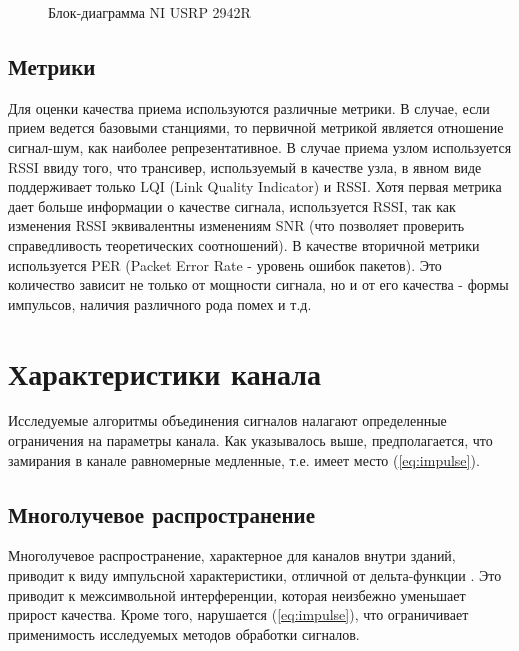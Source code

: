 \documentclass[a4paper,12pt,oneside, abstract=true]{scrartcl}
\begin{document}
\begin{figure}[h!]
\caption{Блок-диаграмма NI USRP 2942R}
\label{fig:USRPBD}
\end{figure}

\subsection{Метрики}
Для оценки качества приема используются различные метрики.
В случае, если прием ведется базовыми станциями, то первичной метрикой является отношение сигнал-шум, как наиболее репрезентативное.
В случае приема узлом используется RSSI ввиду того, что трансивер, используемый в качестве узла, в явном виде поддерживает только LQI (Link Quality Indicator) и RSSI. 
Хотя первая метрика дает больше информации о качестве сигнала, используется RSSI, так как изменения RSSI эквивалентны изменениям SNR (что позволяет проверить справедливость теоретических соотношений).
В качестве вторичной метрики используется PER (Packet Error Rate - уровень ошибок пакетов). Это количество зависит не только от мощности сигнала, но и от его качества - формы импульсов, наличия различного рода помех и т.д.
\clearpage

\section{Характеристики канала}
Исследуемые алгоритмы объединения сигналов налагают определенные ограничения на параметры канала. 
Как указывалось выше, предполагается, что замирания в канале равномерные медленные, т.е. имеет место (\ref{eq:impulse}). 
\subsection{Многолучевое распространение}
Многолучевое распространение, характерное для каналов внутри зданий, приводит к виду импульсной характеристики, отличной от дельта-функции \cite{B2}. 
Это приводит к межсимвольной интерференции, которая неизбежно уменьшает прирост качества.
Кроме того, нарушается (\ref{eq:impulse}), что ограничивает применимость исследуемых методов обработки сигналов.
\end{document}
